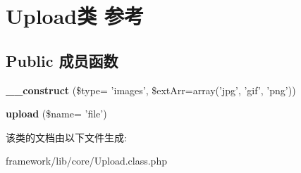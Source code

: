 \hypertarget{classUpload}{\section{Upload类 参考}
\label{classUpload}
}
\subsection*{Public 成员函数}
\begin{DoxyCompactItemize}
\item 
\hypertarget{classUpload_acc3501937980700dd62cd997d12cd94b}{{\bfseries \+\_\+\+\_\+construct} (\$type= 'images', \$ext\+Arr=array('jpg', 'gif', 'png'))}\label{classUpload_acc3501937980700dd62cd997d12cd94b}

\item 
\hypertarget{classUpload_ae3c33e8a28fcb3ded1743dc67ef4d4fc}{{\bfseries upload} (\$name= 'file')}\label{classUpload_ae3c33e8a28fcb3ded1743dc67ef4d4fc}

\end{DoxyCompactItemize}


该类的文档由以下文件生成\+:\begin{DoxyCompactItemize}
\item 
framework/lib/core/Upload.\+class.\+php\end{DoxyCompactItemize}
